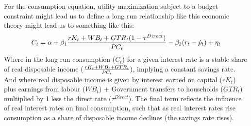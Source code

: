 \documentclass[letterpaper,10pt,english]{jupyterBook}
\begin{document}
\sphinxAtStartPar
For the consumption equation, utility maximization subject to a budget constraint might lead us to define a long run relationship like this economic theory might lead us to something like this:
\begin{equation*}
\begin{split} C_t = \alpha + \beta_1{{rK_t + WB_{t} + GTR_{t}(1-\tau^{Direct})}\over {PC_t}}-\beta_3(r_t-\dot{p}_t) +\eta_t\end{split}
\end{equation*}
\sphinxAtStartPar
Where in the long run consumption (\(C_t\)) for a given interest rate is a stable share of real disposable income (\({{rK_t + WB_{t} + GTR_{t}}\over {PC_t}})\), implying a constant savings rate. And where real disposable income is given by interest earned on capital (\(rK_t\)) plus earnings from labour (\(WB_{t}\)) + Government transfers to households (\(GTR_{t}\)) multiplied by 1 less the direct  rate (\(\tau^{Direct}\)).  The final term reflects the influence of real interest rates on final consumption, such that as real interest rates rise consumption as a share of disposable income declines (the savings rate rises).
\end{document}
